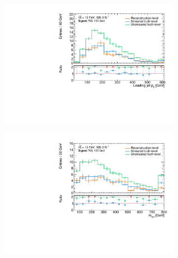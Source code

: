 \begin{figure}
\begin{subfigure}[b]{0.45\linewidth}
	\end{subfigure}\hfill
	\begin{subfigure}[b]{0.45\linewidth}
		\centering\includegraphics[width=\textwidth]{20210324/700_150/jet1Pt_C1N2_Wh_hbb_700p0_150p0_smeared.pdf}
	\end{subfigure}\hfill
	\begin{subfigure}[b]{0.45\linewidth}
		\centering\includegraphics[width=\textwidth]{20210324/700_150/mlb1_C1N2_Wh_hbb_700p0_150p0_smeared.pdf}
	\end{subfigure}\hfill
	\begin{subfigure}[b]{0.45\linewidth}

\end{subfigure}
\end{figure}
